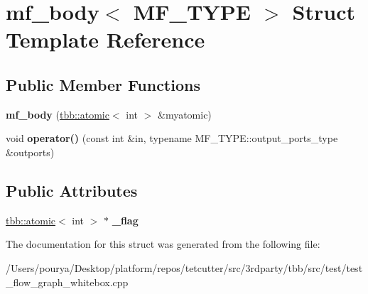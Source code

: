 \hypertarget{structmf__body}{}\section{mf\+\_\+body$<$ M\+F\+\_\+\+T\+Y\+P\+E $>$ Struct Template Reference}
\label{structmf__body}
\subsection*{Public Member Functions}
\begin{DoxyCompactItemize}
\item 
\hypertarget{structmf__body_a5ad6d4d9f66483b532054562c8771ade}{}{\bfseries mf\+\_\+body} (\hyperlink{structtbb_1_1atomic}{tbb\+::atomic}$<$ int $>$ \&myatomic)\label{structmf__body_a5ad6d4d9f66483b532054562c8771ade}

\item 
\hypertarget{structmf__body_a6a598212f12203df47a231b2eeeb68cc}{}void {\bfseries operator()} (const int \&in, typename M\+F\+\_\+\+T\+Y\+P\+E\+::output\+\_\+ports\+\_\+type \&outports)\label{structmf__body_a6a598212f12203df47a231b2eeeb68cc}

\end{DoxyCompactItemize}
\subsection*{Public Attributes}
\begin{DoxyCompactItemize}
\item 
\hypertarget{structmf__body_a54b73bbdef6cfa85001bc4a15fa01efb}{}\hyperlink{structtbb_1_1atomic}{tbb\+::atomic}$<$ int $>$ $\ast$ {\bfseries \+\_\+flag}\label{structmf__body_a54b73bbdef6cfa85001bc4a15fa01efb}

\end{DoxyCompactItemize}


The documentation for this struct was generated from the following file\+:\begin{DoxyCompactItemize}
\item 
/\+Users/pourya/\+Desktop/platform/repos/tetcutter/src/3rdparty/tbb/src/test/test\+\_\+flow\+\_\+graph\+\_\+whitebox.\+cpp\end{DoxyCompactItemize}
